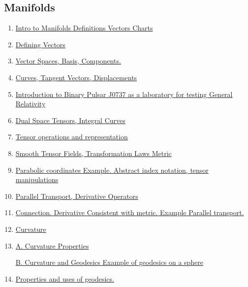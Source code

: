 \documentclass[11pt]{article}
\begin{document}
\vspace{-0.75cm}

\subsection*{\large Manifolds}

\vspace{-0.5cm}

\begin{enumerate}
	\item \href{https://mp.weixin.qq.com/s/tpL9gXtd3erc4jqpK5FsFA}{Intro to Manifolds Definitions Vectors Charts}	%
	\item \href{https://mp.weixin.qq.com/s/aot6dca1lUNF3n-6dbaB5Q}{Defining Vectors}	%
	\item \href{https://mp.weixin.qq.com/s/Jv7TzOdCXAJZkKpFppYf7g}{Vector Spaces, Basis, Components.}	%
	\item \href{https://mp.weixin.qq.com/s/NU1bo8LWEjgEJSg3Palh5Q}{Curves, Tangent Vectors, Displacements}	%
	\item \href{https://mp.weixin.qq.com/s/Vfm3Ft5WKhbNpAixz8-W5w}{Introduction to Binary Pulsar J0737 as a laboratory for testing General Relativity}	%
	\item \href{https://mp.weixin.qq.com/s/Y1-AMCM_hmaGzqwzYxAfuA}{Dual Space Tensors, Integral Curves}	%
	\item \href{https://mp.weixin.qq.com/s/t4OY7H_JTHyTMl-nP9M4Ig}{Tensor operations and representation}	%
	\item \href{https://mp.weixin.qq.com/s/9RRZpl8pWliDWT4SBIb_Hg}{Smooth Tensor Fields, Transformation Laws Metric}	%
	\item \href{https://mp.weixin.qq.com/s/1x3AVqwRMthOCtI02ZhZYQ}{Parabolic coordinates Example. Abstract index notation, tensor manipulations}	%
	\item \href{https://mp.weixin.qq.com/s/Sj1SVa3Xoh6t4aS4EAQQAQ}{Parallel Transport, Derivative Operators}	%
	\item \href{https://mp.weixin.qq.com/s/h_ZK3Oyh7bh3NcRNg-7Hfw}{Connection. Derivative Consistent with metric. Example Parallel transport.}	%
	\item \href{https://mp.weixin.qq.com/s/nNVMBJgfbPWXTo-gO-X89w}{Curvature}	%
	\item \href{https://mp.weixin.qq.com/s/2GJle5u6Kah-wLuOBZE2lA}{A. Curvature Properties}	%
	
	\href{https://mp.weixin.qq.com/s/ig5s4xVEqot__H5I8QsChg}{B. Curvature and Geodesics Example of geodesics on a sphere}
	\item \href{https://mp.weixin.qq.com/s/tT1hES2onZgXVGcLtxlKrg}{Properties and uses of geodesics.}%
\end{enumerate}
\end{document}
